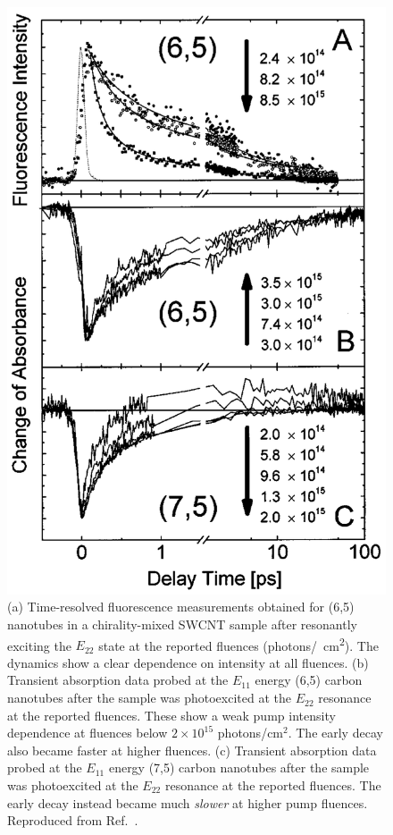 \begin{figure}[H]
	\centering
	\includegraphics[scale=0.3]{images/chapter_prior_works/fluorescence_abs_2_ma_2004}
	\caption{(a) Time-resolved fluorescence measurements obtained for (6,5) nanotubes in a chirality-mixed SWCNT sample after resonantly exciting the $E_{22}$ state at the reported fluences (photons\si{/\cm \squared}). The dynamics show a clear dependence on intensity at all fluences. (b) Transient absorption data probed at the $E_{11}$ energy (6,5) carbon nanotubes after the sample was photoexcited at the $E_{22}$ resonance at the reported fluences. These show a weak pump intensity dependence at fluences below $2 \times 10^{15}$ photons/cm$^2$. The early decay also became faster at higher fluences. (c) Transient absorption data probed at the $E_{11}$ energy (7,5) carbon nanotubes after the sample was photoexcited at the $E_{22}$ resonance at the reported fluences. The early decay instead became much \textit{slower} at higher pump fluences. Reproduced from Ref.\ \cite{ma2004ultrafast}.}
	\label{fig:fluorescence_abs_ma_2004}
\end{figure}

